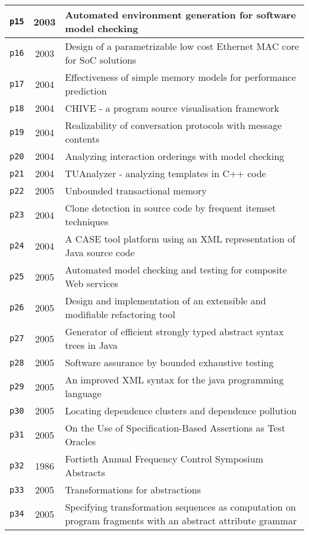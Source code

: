 \begin{longtable}{| c | c | p{16cm} |}
  \hline
  \texttt{p15} & 2003 & Automated environment generation for software model checking \\
  \hline
  \texttt{p16} & 2003 & Design of a parametrizable low cost Ethernet MAC core for SoC solutions \\
  \hline
  \texttt{p17} & 2004 & Effectiveness of simple memory models for performance prediction \\
  \hline
  \texttt{p18} & 2004 & CHIVE - a program source visualisation framework \\
  \hline
  \texttt{p19} & 2004 & Realizability of conversation protocols with message contents \\
  \hline
  \texttt{p20} & 2004 & Analyzing interaction orderings with model checking \\
  \hline
  \texttt{p21} & 2004 & TUAnalyzer - analyzing templates in C++ code \\
  \hline
  \texttt{p22} & 2005 & Unbounded transactional memory \\
  \hline
  \texttt{p23} & 2004 & Clone detection in source code by frequent itemset techniques \\
  \hline
  \texttt{p24} & 2004 & A CASE tool platform using an XML representation of Java source code \\
  \hline
  \texttt{p25} & 2005 & Automated model checking and testing for composite Web services \\
  \hline
  \texttt{p26} & 2005 & Design and implementation of an extensible and modifiable refactoring tool \\
  \hline
  \texttt{p27} & 2005 & Generator of efficient strongly typed abstract syntax trees in Java \\
  \hline
  \texttt{p28} & 2005 & Software assurance by bounded exhaustive testing \\
  \hline
  \texttt{p29} & 2005 & An improved XML syntax for the java programming language \\
  \hline
  \texttt{p30} & 2005 & Locating dependence clusters and dependence pollution \\
  \hline
  \texttt{p31} & 2005 & On the Use of Specification-Based Assertions as Test Oracles \\
  \hline
  \texttt{p32} & 1986 & Fortieth Annual Frequency Control Symposium Abstracts \\
  \hline
  \texttt{p33} & 2005 & Transformations for abstractions \\
  \hline
  \texttt{p34} & 2005 & Specifying transformation sequences as computation on program fragments with an abstract attribute grammar \\

\end{longtable}
